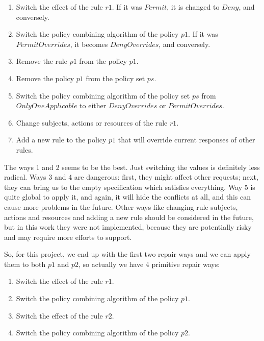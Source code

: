 \documentclass{acm_proc_article-sp}
\begin{document}
\begin{enumerate}
\item Switch the effect of the rule $r1$. If it was $Permit$, it is changed to $Deny$, and conversely.
\item Switch the policy combining algorithm of the policy $p1$. If it was $PermitOverrides$, it becomes $DenyOverrides$, and conversely.
\item Remove the rule $p1$ from the policy $p1$.
\item Remove the policy $p1$ from the policy set $ps$.
\item Switch the policy combining algorithm of the policy set $ps$ from $OnlyOneApplicable$ to either $DenyOverrides$ or $PermitOverrides$.
\item Change subjects, actions or resources of the rule $r1$.
\item Add a new rule to the policy $p1$ that will override current responses of other rules.
\end{enumerate}

The ways 1 and 2 seems to be the best. Just switching the values is definitely less radical. Ways 3 and 4 are dangerous: first, they might affect other requests; next, they can bring us to the empty specification which satisfies everything. Way 5 is quite global to apply it, and again, it will hide the conflicts at all, and this can cause more problems in the future. Other ways like changing rule subjects, actions and resources and adding a new rule should be considered in the future, but in this work they were not implemented, because they are potentially risky and may require more efforts to support. 

So, for this project, we end up with the first two repair ways and we can apply them to both $p1$ and $p2$, so actually we have 4 primitive repair ways:

\begin{enumerate}
\item Switch the effect of the rule $r1$.
\item Switch the policy combining algorithm of the policy $p1$.
\item Switch the effect of the rule $r2$.
\item Switch the policy combining algorithm of the policy $p2$.
\end{enumerate}
\end{document}
